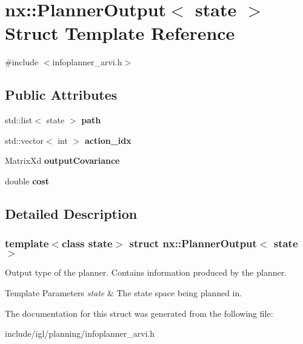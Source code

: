 \hypertarget{structnx_1_1PlannerOutput}{}\section{nx\+:\+:Planner\+Output$<$ state $>$ Struct Template Reference}
\label{structnx_1_1PlannerOutput}


{\ttfamily \#include $<$infoplanner\+\_\+arvi.\+h$>$}

\subsection*{Public Attributes}
\begin{DoxyCompactItemize}
\item 
\mbox{\label{structnx_1_1PlannerOutput_a000c6bd6677643d0fb153504dfa5d240}} 
std\+::list$<$ state $>$ {\bfseries path}
\item 
\mbox{\label{structnx_1_1PlannerOutput_ac32957d6885a6c81876f64233950f3c6}} 
std\+::vector$<$ int $>$ {\bfseries action\+\_\+idx}
\item 
\mbox{\label{structnx_1_1PlannerOutput_ab3fe26d814ddec9f6d1ecef0816154c3}} 
Matrix\+Xd {\bfseries output\+Covariance}
\item 
\mbox{\label{structnx_1_1PlannerOutput_a70365b605068df026d62c67fad27309e}} 
double {\bfseries cost}
\end{DoxyCompactItemize}


\subsection{Detailed Description}
\subsubsection*{template$<$class state$>$\newline
struct nx\+::\+Planner\+Output$<$ state $>$}

Output type of the planner. Contains information produced by the planner. 
\begin{DoxyTemplParams}{Template Parameters}
{\em state} & The state space being planned in. \\
\hline
\end{DoxyTemplParams}


The documentation for this struct was generated from the following file\+:\begin{DoxyCompactItemize}
\item 
include/igl/planning/infoplanner\+\_\+arvi.\+h\end{DoxyCompactItemize}

